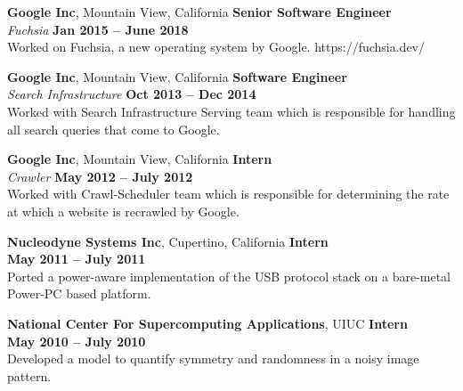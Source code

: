 \documentclass[margin,line]{resume}
\begin{document}
\begin{resume}
    \textbf{Google Inc}, Mountain View, California \hfill \textbf{Senior Software Engineer} \vspace{2mm}\\\vspace{1mm}%
    \textsl{Fuchsia} \hfill \textbf{Jan 2015 -- June 2018}\\
    Worked on Fuchsia, a new operating system by Google.
    https://fuchsia.dev/

    \textbf{Google Inc}, Mountain View, California \hfill \textbf{Software Engineer} \vspace{2mm}\\\vspace{1mm}%
    \textsl{Search Infrastructure} \hfill \textbf{Oct 2013 -- Dec 2014}\vspace{1.5mm}\\\vspace{0mm}%
     Worked with Search Infrastructure Serving team which is responsible for handling all search queries that come to Google. 

    \textbf{Google Inc}, Mountain View, California \hfill \textbf{Intern} \vspace{2mm}\\\vspace{1mm}%
    \textsl{Crawler} \hfill \textbf{May 2012 -- July 2012}\\
    Worked with Crawl-Scheduler team which is responsible for determining the rate at which a website is recrawled by Google.

    \textbf{Nucleodyne Systems Inc}, Cupertino, California \hfill \textbf{Intern} \vspace{2mm}\\\vspace{1mm}%
    \hfill \textbf{May 2011 -- July 2011}\\
    Ported a power-aware implementation of the USB protocol stack on a bare-metal Power-PC based platform.

   \textbf{National Center For Supercomputing Applications}, UIUC \hfill \textbf{Intern} \vspace{2mm}\\\vspace{1mm}%
    \hfill \textbf{May 2010 -- July 2010}\\
    Developed a model to quantify symmetry and randomness in a noisy image pattern.


\end{resume}
\end{document}
